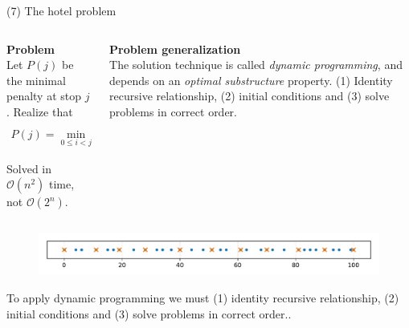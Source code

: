 \documentclass[11pt, aspectratio=149]{beamer}
\theoremstyle{plain}
\begin{document}
\begin{frame}[fragile, t]{(7) The hotel problem}
	\begin{columns}
		\begin{column}{0.5\textwidth}
			\textbf{Problem} \\ 
			Let $P(j)$ be the minimal penalty at stop $j$.
			Realize that
			\begin{align*}
			P(j) = \min_{ 0 \leq i < j}
			\left( P(i) + (M - (h_j - h_i))^2 \right).
			\end{align*}
			
			Solved in $\mathcal{O}(n^2)$ time, not $\mathcal{O}(2^n)$.
			
		\end{column}
		\begin{column}{0.5\textwidth}%
			\textbf{Problem generalization} \\ \vspace*{0.5em} 
			The solution technique is called \emph{dynamic programming}, and depends on an \emph{optimal substructure} property.
			(1) Identity recursive relationship, (2) initial conditions and (3) solve problems in correct order.
		\end{column}
	\end{columns}
	
		\begin{figure}
			\centering
			\includegraphics[width=1\linewidth]{figs/hotel_problem_instance_large_solution.pdf}
		\end{figure}
		\vspace*{-1em}
		{\small To apply dynamic programming we must (1) identity recursive relationship, (2) initial conditions and (3) solve problems in correct order..}
\end{frame}


\end{document}
